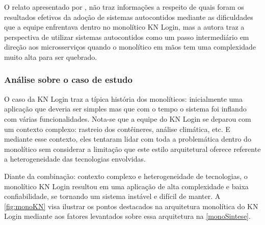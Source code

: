 O relato apresentado por , não traz informações a respeito
de quais foram os resultados efetivos da adoção de sistemas autocontidos mediante as dificuldades
que a equipe enfrentava dentro no monolítico KN Login, mas a autora traz a perspectiva de utilizar
sistemas autocontidos como um passo intermediário em direção aos microsserviços quando o monolítico
em mãos tem uma complexidade muito alta para ser quebrado.

\subsubsection{Análise sobre o caso de estudo}

O caso da KN Login traz a típica história dos monolíticos: inicialmente uma aplicação que deveria
ser simples mas que com o tempo o sistema foi inflando com várias funcionalidades. Nota-se que a
equipe do KN Login se deparou com um contexto complexo: rastreio dos contêineres, análise climática,
etc. E mediante esse contexto, eles tentaram lidar com toda a problemática dentro do monolítico sem
considerar a limitação que este estilo arquitetural oferece referente a heterogeneidade das
tecnologias envolvidas.

Diante da combinação: contexto complexo e heterogeneidade de tecnologias, o monolítico KN Login
resultou em uma aplicação de alta complexidade e baixa confiabilidade, se tornando um sistema
instável e difícil de manter. A \autoref{fig:monoKN} visa ilustrar os pontos destacados na
arquitetura monolítica do KN Login mediante aos fatores levantados sobre essa arquitetura na
\autoref{monoSintese}. 

